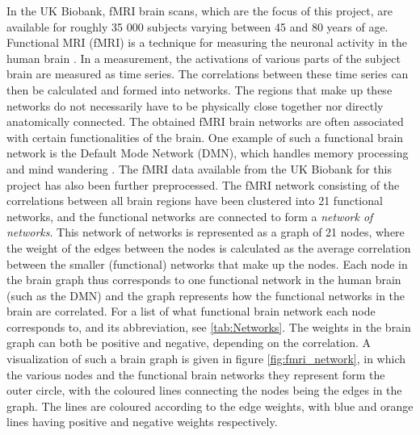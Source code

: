In the UK Biobank, fMRI brain scans, which are the focus of this project, are available for roughly 35 000 subjects varying between 45 and 80 years of age. Functional MRI (fMRI) is a technique for measuring the neuronal activity in the human brain \cite{sporns}. In a measurement, the activations of various parts of the subject brain are measured as time series. The correlations between these time series can then be calculated and formed into networks. The regions that make up these networks do not necessarily have to be physically close together nor directly anatomically connected. The obtained fMRI brain networks are often associated with certain functionalities of the brain. One example of such a functional brain network is the Default Mode Network (DMN), which handles memory processing and mind wandering \cite{alves_dmn}. 
The fMRI data available from the UK Biobank for this project has also been further preprocessed. The fMRI network consisting of the correlations between all brain regions have been clustered into 21 functional networks, and the functional networks are connected to form a \textit{network of networks}. This network of networks is represented as a graph of 21 nodes, where the weight of the edges between the nodes is calculated as the average correlation between the smaller (functional) networks that make up the nodes. Each node in the brain graph thus corresponds to one functional network in the human brain (such as the DMN) and the graph represents how the functional networks in the brain are correlated. For a list of what functional brain network each node corresponds to, and its abbreviation, see \cref{tab:Networks}. The weights in the brain graph can both be positive and negative, depending on the correlation. A visualization of such a brain graph is given in figure \ref{fig:fmri_network}, in which the various nodes and the functional brain networks they represent form the outer circle, with the coloured lines connecting the nodes being the edges in the graph. The lines are coloured according to the edge weights, with blue and orange lines having positive and negative weights respectively.


